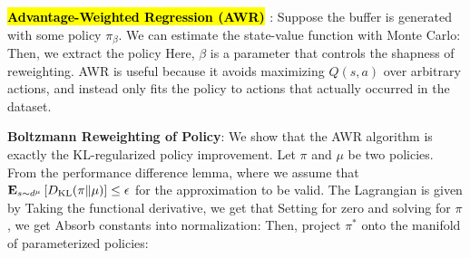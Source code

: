\documentclass{article}
\begin{document}
  \textbf{\hl{Advantage-Weighted Regression (AWR)} \cite{peng2019advantage}}: Suppose the buffer is generated with some policy $\pi_\beta$. We can estimate the state-value function with Monte Carlo:
  Then, we extract the policy
  Here, $\beta$ is a parameter that controls the shapness of reweighting. AWR is useful because it avoids maximizing $Q(s,a)$ over arbitrary actions, and instead only fits the policy to actions that actually occurred in the dataset.

  \textbf{Boltzmann Reweighting of Policy}: We show that the AWR algorithm is exactly the KL-regularized policy improvement. Let $\pi$ and $\mu$ be two policies. From the performance difference lemma,
  where we assume that $\mathbf{E}_{s\sim d^\mu}\left[ D_\text{KL}(\pi\Vert\mu) \right] \leq \epsilon$ for the approximation to be valid. The Lagrangian is given by
  Taking the functional derivative, we get that
  Setting for zero and solving for $\pi$, we get
  Absorb constants into normalization:
  Then, project $\pi^*$ onto the manifold of parameterized policies:
\end{document}
